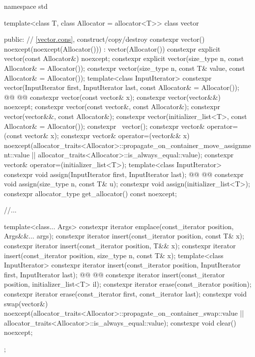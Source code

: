 \documentclass{wg21}
\begin{document}
\begin{codeblock}
namespace std {
    template<class T, class Allocator = allocator<T>>
    class vector {
        public:
        // \ref{vector.cons}, construct/copy/destroy
        constexpr vector() noexcept(noexcept(Allocator())) : vector(Allocator()) { }
        constexpr explicit vector(const Allocator&) noexcept;
        constexpr explicit vector(size_type n, const Allocator& = Allocator());
        constexpr vector(size_type n, const T& value, const Allocator& = Allocator());
        template<class InputIterator>
        constexpr vector(InputIterator first, InputIterator last, const Allocator& = Allocator());
        @@
        @@
        constexpr vector(const vector& x);
        constexpr vector(vector&&) noexcept;
        constexpr vector(const vector&, const Allocator&);
        constexpr vector(vector&&, const Allocator&);
        constexpr vector(initializer_list<T>, const Allocator& = Allocator());
        constexpr ~vector();
        constexpr vector& operator=(const vector& x);
        constexpr vector& operator=(vector&& x)
        noexcept(allocator_traits<Allocator>::propagate_on_container_move_assignment::value ||
        allocator_traits<Allocator>::is_always_equal::value);
        constexpr vector& operator=(initializer_list<T>);
        template<class InputIterator>
        constexpr void assign(InputIterator first, InputIterator last);
        @@
        @@
        constexpr void assign(size_type n, const T& u);
        constexpr void assign(initializer_list<T>);
        constexpr allocator_type get_allocator() const noexcept;
        
        //...
        
        template<class... Args> constexpr iterator emplace(const_iterator position, Args&&... args);
        constexpr iterator insert(const_iterator position, const T& x);
        constexpr iterator insert(const_iterator position, T&& x);
        constexpr iterator insert(const_iterator position, size_type n, const T& x);
        template<class InputIterator>
        constexpr iterator insert(const_iterator position, InputIterator first, InputIterator last);
        @@
        @@
        constexpr iterator insert(const_iterator position, initializer_list<T> il);
        constexpr iterator erase(const_iterator position);
        constexpr iterator erase(const_iterator first, const_iterator last);
        constexpr void     swap(vector&)
        noexcept(allocator_traits<Allocator>::propagate_on_container_swap::value ||
        allocator_traits<Allocator>::is_always_equal::value);
        constexpr void     clear() noexcept;
    };
    
}
\end{codeblock}
\end{document}
